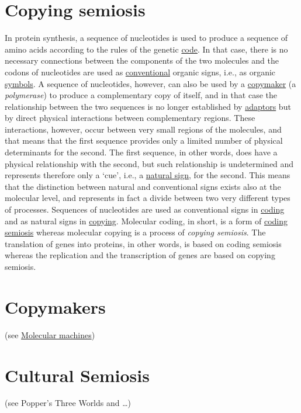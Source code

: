 \documentclass[12pt]{article}
\begin{document}
\section{Copying semiosis}
In protein synthesis, a sequence of nucleotides is used to produce a sequence of amino acids according to the rules of the genetic \hyperlink{code}{code}. In that case, there is no necessary connections between the components of the two molecules and the codons of nucleotides are used as \hyperlink{natural_conventions}{conventional} organic signs, i.e., as organic \hyperlink{icons_indexes_and_symbols}{symbols}. A sequence of nucleotides, however, can also be used by a \hyperlink{copymakers}{copymaker} (a \textit{polymerase}) to produce a complementary copy of itself, and in that case the relationship between the two sequences is no longer established by \hyperlink{adaptor}{adaptors} but by direct physical interactions between complementary regions. These interactions, however, occur between very small regions of the molecules, and that means that the first sequence provides only a limited number of physical determinants for the second. The first sequence, in other words, does have a physical relationship with the second, but such relationship is undetermined and represents therefore only a `cue', i.e., a \hyperlink{natural_signs}{natural sign}, for the second. This means that the distinction between natural and conventional signs exists also at the molecular level, and represents in fact a divide between two very different types of processes. Sequences of nucleotides are used as conventional signs in \hyperlink{copying_and_coding}{coding} and as natural signs in \hyperlink{copying_and_coding}{copying}. Molecular coding, in short, is a form of \hyperlink{coding_semiosis}{coding semiosis} whereas molecular copying is a process of \textit{copying semiosis}. The translation of genes into proteins, in other words, is based on coding semiosis whereas the replication and the transcription of genes are based on copying semiosis.


\hypertarget{copymakers}{}
\section{Copymakers} (see \hyperlink{molecular_machines}{Molecular machines}) 
 

\hypertarget{cultural_semiosis}{}
\section{Cultural Semiosis} (see Popper's Three Worlds and …)
\end{document}
